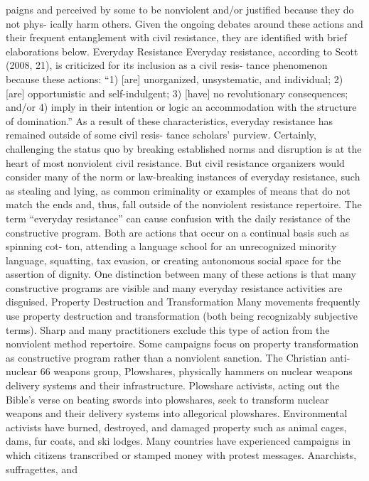 \documentclass[twoside,a4paper,12pt,fleqn,openany]{extbook}
\begin{document}
paigns and perceived by some to be nonviolent and/or justified because they do not phys-
ically harm others. Given the ongoing debates around these actions and their frequent
entanglement with civil resistance, they are identified with brief elaborations below.
Everyday Resistance
Everyday resistance, according to Scott (2008, 21), is criticized for its inclusion as a civil resis-
tance phenomenon because these actions: “1) [are] unorganized, unsystematic, and individual;
2) [are] opportunistic and self-indulgent; 3) [have] no revolutionary consequences; and/or 4)
imply in their intention or logic an accommodation with the structure of domination.” As a
result of these characteristics, everyday resistance has remained outside of some civil resis-
tance scholars’ purview.
Certainly, challenging the status quo by breaking established norms and disruption is at
the heart of most nonviolent civil resistance. But civil resistance organizers would consider
many of the norm or law-breaking instances of everyday resistance, such as stealing and
lying, as common criminality or examples of means that do not match the ends and, thus, fall
outside of the nonviolent resistance repertoire.
The term “everyday resistance” can cause confusion with the daily resistance of the
constructive program. Both are actions that occur on a continual basis such as spinning cot-
ton, attending a language school for an unrecognized minority language, squatting, tax
evasion, or creating autonomous social space for the assertion of dignity. One distinction
between many of these actions is that many constructive programs are visible and many
everyday resistance activities are disguised.
Property Destruction and Transformation
Many movements frequently use property destruction and transformation (both being
recognizably subjective terms). Sharp and many practitioners exclude this type of action
from the nonviolent method repertoire. Some campaigns focus on property transformation
as constructive program rather than a nonviolent sanction. The Christian anti-nuclear
66
weapons group, Plowshares, physically hammers on nuclear weapons delivery systems
and their infrastructure. Plowshare activists, acting out the Bible’s verse on beating swords
into plowshares, seek to transform nuclear weapons and their delivery systems into
allegorical plowshares.
Environmental activists have burned, destroyed, and damaged property such as animal
cages, dams, fur coats, and ski lodges. Many countries have experienced campaigns in which
citizens transcribed or stamped money with protest messages. Anarchists, suffragettes, and
\end{document}
